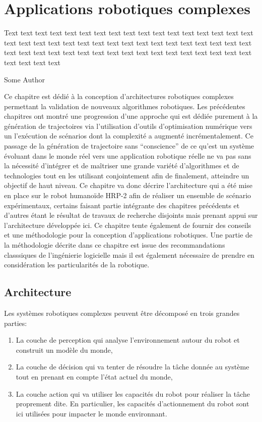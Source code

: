 \chapter{Applications robotiques complexes}
\label{chap:integration}

\epigraph{Text text text text text text text text text text text text
  text text text text text text text text text text text text text
  text text text text text text text text text text text text text
  text text text text text text text text text text text text text
  text text text text}{Some Author}
\clearpage


Ce chapitre est dédié à la conception d'architectures robotiques
complexes permettant la validation de nouveaux algorithmes robotiques.
Les précédentes chapitres ont montré une progression d'une approche
qui est dédiée purement à la génération de trajectoires via
l'utilisation d'outils d'optimisation numérique vers un l'exécution de
scénarios dont la complexité a augmenté incrémentalement. Ce passage
de la génération de trajectoire sans ``conscience'' de ce qu'est un
système évoluant dans le monde réel vers une application robotique
réelle ne va pas sans la nécessité d'intégrer et de maîtriser une
grande variété d'algorithmes et de technologies tout en les utilisant
conjointement afin de finalement, atteindre un objectif de haut
niveau. Ce chapitre va donc décrire l'architecture qui a été mise en
place sur le robot humanoïde HRP-2 afin de réaliser un ensemble de
scénario expérimentaux, certains faisant partie intégrante des
chapitres précédents et d'autres étant le résultat de travaux de
recherche disjoints mais prenant appui sur l'architecture développée
ici. Ce chapitre tente également de fournir des conseils et une
méthodologie pour la conception d'applications robotiques. Une partie
de la méthodologie décrite dans ce chapitre est issue des
recommandations classsiques de l'ingénierie logicielle mais il est
également nécessaire de prendre en considération les particularités de
la robotique.

\section{Architecture}


Les systèmes robotiques complexes peuvent être décomposé en trois
grandes parties:

\begin{enumerate}
\item La couche de perception qui analyse l'environnement autour du
  robot et construit un modèle du monde,
\item La couche de décision qui va tenter de résoudre la tâche donnée
  au système tout en prenant en compte l'état actuel du monde,
\item La couche action qui va utiliser les capacités du robot pour
  réaliser la tâche proprement dite. En particulier, les capacités
  d'actionnement du robot sont ici utilisées pour impacter le monde
  environnant.
\end{enumerate}



